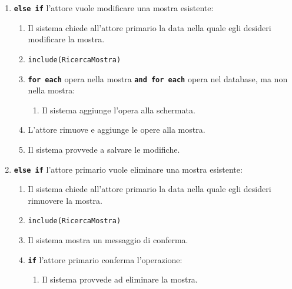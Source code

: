 \documentclass{article}
\begin{document}
\begin{enumerate}[itemsep=8pt,parsep=0pt]
		\item \texttt{\textbf{else if}}  l’attore vuole modificare una mostra esistente:
		    \begin{enumerate}[leftmargin=28pt]
				\item Il sistema chiede all'attore primario la data nella quale egli desideri modificare la mostra.
		    \item  \texttt{{include(RicercaMostra)}}
			\item \texttt{\textbf{for each}} opera nella mostra \texttt{\textbf{and for each}} opera nel database, ma non nella mostra:
			    \begin{enumerate}	[leftmargin=28pt]
					\item Il sistema aggiunge l'opera alla schermata.
                \end{enumerate}
			\item L'attore rimuove e aggiunge le opere alla mostra.
            \item  Il sistema provvede a salvare le modifiche.
  			\end{enumerate}	
  			
  		\item \texttt{\textbf{else if}} l'attore primario vuole eliminare una mostra esistente:
			    \begin{enumerate}	[leftmargin=28pt]
				\item Il sistema chiede all'attore primario la data nella quale egli desideri rimuovere la mostra.
			    \item  \texttt{{include(RicercaMostra)}}
				\item  Il sistema mostra un messaggio di conferma.
				\item \texttt{\textbf{if}}  l'attore primario conferma l'operazione:
				    \begin{enumerate}	[leftmargin=28pt]
				    \item  Il sistema provvede ad eliminare la mostra.
				    \end{enumerate}
	            \end{enumerate}
	        
	    \end{enumerate}
	
\end{document}
